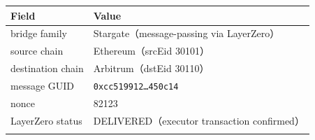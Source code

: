\documentclass[12pt,a4paper]{ctexart}
\begin{document}
\begin{longtable}[]{@{}ll@{}}
\toprule
\begin{minipage}[b]{0.47\columnwidth}\raggedright
Field\strut
\end{minipage} & \begin{minipage}[b]{0.47\columnwidth}\raggedright
Value\strut
\end{minipage}\tabularnewline
\midrule
\endhead
\begin{minipage}[t]{0.47\columnwidth}\raggedright
bridge family\strut
\end{minipage} & \begin{minipage}[t]{0.47\columnwidth}\raggedright
Stargate（message-passing via LayerZero）\strut
\end{minipage}\tabularnewline
\begin{minipage}[t]{0.47\columnwidth}\raggedright
source chain\strut
\end{minipage} & \begin{minipage}[t]{0.47\columnwidth}\raggedright
Ethereum（srcEid 30101）\strut
\end{minipage}\tabularnewline
\begin{minipage}[t]{0.47\columnwidth}\raggedright
destination chain\strut
\end{minipage} & \begin{minipage}[t]{0.47\columnwidth}\raggedright
Arbitrum（dstEid 30110）\strut
\end{minipage}\tabularnewline
\begin{minipage}[t]{0.47\columnwidth}\raggedright
message GUID\strut
\end{minipage} & \begin{minipage}[t]{0.47\columnwidth}\raggedright
\texttt{0xcc519912\ldots{}450c14}\strut
\end{minipage}\tabularnewline
\begin{minipage}[t]{0.47\columnwidth}\raggedright
nonce\strut
\end{minipage} & \begin{minipage}[t]{0.47\columnwidth}\raggedright
82123\strut
\end{minipage}\tabularnewline
\begin{minipage}[t]{0.47\columnwidth}\raggedright
LayerZero status\strut
\end{minipage} & \begin{minipage}[t]{0.47\columnwidth}\raggedright
DELIVERED（executor transaction confirmed）\strut
\end{minipage}\tabularnewline
\begin{minipage}[t]{0.47\columnwidth}\raggedright

\end{minipage}
\end{longtable}
\end{document}
